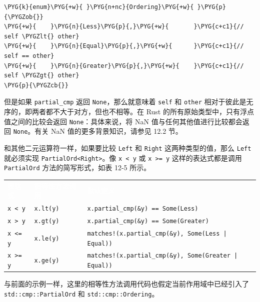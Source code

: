 \begin{Verbatim}[commandchars=\\\{\},breaklines=true,breakanywhere=true,fontsize=\codefont,xleftmargin=17bp]
\PYG{k}{enum}\PYG{+w}{ }\PYG{n+nc}{Ordering}\PYG{+w}{ }\PYG{p}{\PYGZob{}}
\PYG{+w}{    }\PYG{n}{Less}\PYG{p}{,}\PYG{+w}{       }\PYG{c+c1}{// self \PYGZlt{} other}
\PYG{+w}{    }\PYG{n}{Equal}\PYG{p}{,}\PYG{+w}{      }\PYG{c+c1}{// self == other}
\PYG{+w}{    }\PYG{n}{Greater}\PYG{p}{,}\PYG{+w}{    }\PYG{c+c1}{// self \PYGZgt{} other}
\PYG{p}{\PYGZcb{}}
\end{Verbatim}

但是如果 \texttt{partial\_cmp} 返回 \texttt{None}，那么就意味着 \texttt{self} 和 \texttt{other} 相对于彼此是无序的，即两者都不大于对方，但也不相等。在 Rust 的所有原始类型中，只有浮点值之间的比较会返回 \texttt{None}：具体来说，将 NaN 值与任何其他值进行比较都会返回 \texttt{None}。有关 NaN 值的更多背景知识，请参见 12.2 节。

和其他二元运算符一样，如果要比较 \texttt{Left} 和 \texttt{Right} 这两种类型的值，那么 \texttt{Left} 就必须实现 \texttt{PartialOrd<Right>}。像 \texttt{x < y} 或 \texttt{x >= y} 这样的表达式都是调用 \texttt{PartialOrd} 方法的简写形式，如表 12-5 所示。


\myTableBegin
\begin{tabularx}{\textwidth}{@{}>{\hsize=0.703\hsize\raggedright\arraybackslash}X>{\hsize=0.722\hsize\raggedright\arraybackslash}X>{\hsize=1.576\hsize\raggedright\arraybackslash}X@{}}
\rowcolor{tabhead}\textcolor{white}{表达式} & \textcolor{white}{相等性方法调用} & \textcolor{white}{默认定义} \\
\texttt{x < y} & \texttt{x.lt(y)} & \texttt{x.partial\_cmp(\&y) == Some(Less)} \\
\texttt{x > y} & \texttt{x.gt(y)} & \texttt{x.partial\_cmp(\&y) == Some(Greater)} \\
\texttt{x <= y} & \texttt{x.le(y)} & \texttt{matches!(x.partial\_cmp(\&y), Some(Less | Equal))} \\
\texttt{x >= y} & \texttt{x.ge(y)} & \texttt{matches!(x.partial\_cmp(\&y), Some(Greater | Equal))} \\
\end{tabularx}
\myTableEnd

与前面的示例一样，这里的相等性方法调用代码也假定当前作用域中已经引入了 \texttt{std::cmp::PartialOrd} 和 \texttt{std::cmp::Ordering}。

